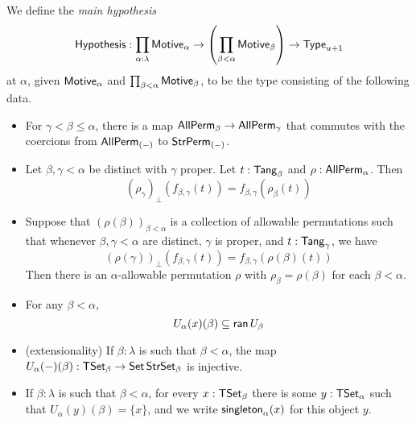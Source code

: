 \begin{definition}
  \label{def:MainHypothesis}
  We define the \emph{main hypothesis}
  \[ \mathsf{Hypothesis} : \prod_{\alpha : \lambda} \mathsf{Motive}_\alpha \to \left( \prod_{\beta < \alpha} \mathsf{Motive}_\beta \right) \to \mathsf{Type}_{u+1} \]
  at \( \alpha \), given \( \mathsf{Motive}_\alpha \) and \( \prod_{\beta < \alpha} \mathsf{Motive}_\beta \), to be the type consisting of the following data.
  \begin{itemize}
    \item For \( \gamma < \beta \leq \alpha \), there is a map \( \mathsf{AllPerm}_\beta \to \mathsf{AllPerm}_\gamma \) that commutes with the coercions from \( \mathsf{AllPerm}_{(-)} \) to \( \mathsf{StrPerm}_{(-)} \).
    \item Let \( \beta, \gamma < \alpha \) be distinct with \( \gamma \) proper.
    Let \( t : \mathsf{Tang}_\beta \) and \( \rho : \mathsf{AllPerm}_\alpha \).
    Then
    \[ (\rho_\gamma)_\bot(f_{\beta,\gamma}(t)) = f_{\beta,\gamma}(\rho_\beta(t)) \]
    \item Suppose that \( (\rho(\beta))_{\beta < \alpha} \) is a collection of allowable permutations such that whenever \( \beta, \gamma < \alpha \) are distinct, \( \gamma \) is proper, and \( t : \mathsf{Tang}_\gamma \), we have
    \[ (\rho(\gamma))_\bot(f_{\beta,\gamma}(t)) = f_{\beta,\gamma}(\rho(\beta)(t)) \]
    Then there is an \( \alpha \)-allowable permutation \( \rho \) with \( \rho_\beta = \rho(\beta) \) for each \( \beta < \alpha \).
    \item For any \( \beta < \alpha \),
    \[ U_\alpha(x)(\beta) \subseteq \operatorname{\mathsf{ran}} U_\beta \]
    \item (extensionality) If \( \beta : \lambda \) is such that \( \beta < \alpha \), the map \( U_\alpha(-)(\beta) : \mathsf{TSet}_\beta \to \operatorname{\mathsf{Set}} \mathsf{StrSet}_\beta \) is injective.
    \item If \( \beta : \lambda \) is such that \( \beta < \alpha \), for every \( x : \mathsf{TSet}_\beta \) there is some \( y : \mathsf{TSet}_\alpha \) such that \( U_\alpha(y)(\beta) = \{ x \} \), and we write \( \operatorname{\mathsf{singleton}}_\alpha(x) \) for this object \( y \).
  \end{itemize}
\end{definition}
